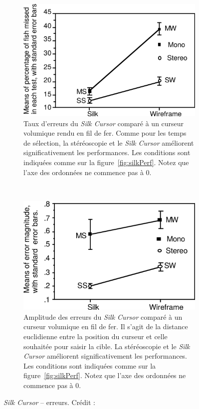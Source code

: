 	\begin{figure}[!htb]
		\begin{subfigure}[t]{0.49\textwidth}
			\centering
			\includegraphics[width=\textwidth]{figures/ch2/silkErrors}
			\caption{Taux d'erreurs du \emph{Silk Cursor} comparé à un curseur volumique rendu en fil de fer. Comme pour les temps de sélection, la stéréoscopie et le \emph{Silk Cursor} améliorent significativement les performances. Les conditions sont indiquées comme sur la figure~\ref{fig:silkPerf}. Notez que l'axe des ordonnées ne commence pas à 0.}
			\label{fig:silkErrors}
		\end{subfigure}
		~
		\begin{subfigure}[t]{0.49\textwidth}
			\centering
			\includegraphics[width=\textwidth]{figures/ch2/silkErrorMag}
			\caption{Amplitude des erreurs du \emph{Silk Cursor} comparé à un curseur volumique en fil de fer. Il s'agit de la distance euclidienne entre la position du curseur et celle souhaitée pour saisir la cible. La stéréoscopie et le \emph{Silk Cursor} améliorent significativement les performances. Les conditions sont indiquées comme sur la figure~\ref{fig:silkPerf}. Notez que l'axe des ordonnées ne commence pas à 0.}
			\label{fig:silkErrorMag}
		\end{subfigure}
		\caption[\emph{Silk Cursor} -- erreurs]{\emph{Silk Cursor} -- erreurs. Crédit : \cite{zhai1994silk}}
		\label{fig:SilkErrorsErrMag}
	\end{figure}
	

